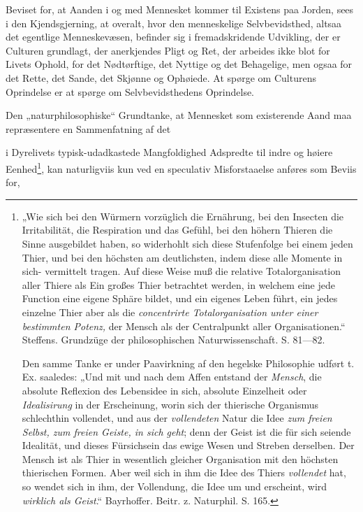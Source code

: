 \documentclass[12pt,a4paper]{book}
\begin{document}
Beviset for, at Aanden i og med Mennesket kommer til Existens paa Jorden, sees i
den Kjendsgjerning, at overalt, hvor den menneskelige Selvbevidsthed, altsaa det
egentlige Menneskevæsen, befinder sig i fremadskridende Udvikling, der er
Culturen grundlagt, der anerkjendes Pligt og Ret, der arbeides ikke blot for
Livets Ophold, for det Nødtørftige, det Nyttige og det Behagelige, men ogsaa for
det Rette, det Sande, det Skjønne og Ophøiede. At spørge om Culturens Oprindelse
er at spørge om Selvbevidsthedens Oprindelse.

Den „naturphilosophiske“ Grundtanke, at Mennesket som existerende Aand maa
repræsentere en Sammenfatning af det

\setcounter{footnote}{0}
i Dyrelivets typisk-udadkastede Mangfoldighed Adspredte til indre og høiere
Eenhed\footnote{„Wie sich bei den Würmern vorzüglich die Ernährung, bei den
Insecten die Irritabilität, die Respiration und das Gefühl, bei den höhern
Thieren die Sinne ausgebildet haben, so widerhohlt sich diese Stufenfolge bei
einem jeden Thier, und bei den höchsten am deutlichsten, indem diese alle
Momente in sich- vermittelt tragen.
Auf diese Weise muß die relative Totalorganisation aller Thiere als Ein großes
Thier betrachtet werden, in welchem eine jede Function eine eigene Sphäre
bildet, und ein eigenes Leben führt, ein jedes einzelne Thier aber als die
\emph{concentrirte Totalorganisation unter einer bestimmten Potenz,} der Mensch
als der Centralpunkt aller Organisationen.“ Steffens. Grundzüge der
philosophischen Naturwissenschaft. S. 81---82.

Den samme Tanke er under Paavirkning af den hegelske Philosophie udført t. Ex.
saaledes: „Und mit und nach dem Affen entstand der \emph{Mensch}, die absolute
Reflexion des Lebensidee in sich, absolute Einzelheit oder \emph{Idealisirung}
in der Erscheinung, worin sich der thierische Organismus schlechthin vollendet,
und aus der \emph{vollendeten} Natur die Idee \emph{zum freien Selbst, zum
freien Geiste, in sich geht}; denn der Geist ist die für sich seiende Idealität,
und dieses Fürsichsein das ewige Wesen und Streben derselben. Der Mensch ist als
Thier in wesentlich gleicher Organisation mit den höchsten thierischen Formen.
Aber weil sich in ihm die Idee des Thiers \emph{vollendet} hat, so wendet sich
in ihm, der Vollendung, die Idee um und erscheint, wird \emph{wirklich als
Geist}.“ Bayrhoffer. Beitr. z. Naturphil. S. 165.
}, kan naturligviis kun ved en speculativ Misforstaaelse anføres som Beviis for,
\end{document}
